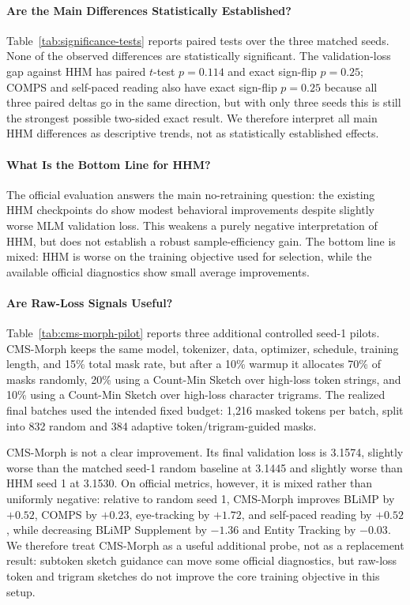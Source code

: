 \paragraph{Are the Main Differences Statistically Established?}
Table~\ref{tab:significance-tests} reports paired tests over the three matched seeds. None of the observed differences are statistically significant. The validation-loss gap against HHM has paired $t$-test $p=0.114$ and exact sign-flip $p=0.25$; COMPS and self-paced reading also have exact sign-flip $p=0.25$ because all three paired deltas go in the same direction, but with only three seeds this is still the strongest possible two-sided exact result. We therefore interpret all main HHM differences as descriptive trends, not as statistically established effects.

\paragraph{What Is the Bottom Line for HHM?}
The official evaluation answers the main no-retraining question: the existing HHM checkpoints do show modest behavioral improvements despite slightly worse MLM validation loss. This weakens a purely negative interpretation of HHM, but does not establish a robust sample-efficiency gain. The bottom line is mixed: HHM is worse on the training objective used for selection, while the available official diagnostics show small average improvements.

\paragraph{Are Raw-Loss Signals Useful?}
Table~\ref{tab:cms-morph-pilot} reports three additional controlled seed-1 pilots. CMS-Morph keeps the same model, tokenizer, data, optimizer, schedule, training length, and 15\% total mask rate, but after a 10\% warmup it allocates 70\% of masks randomly, 20\% using a Count-Min Sketch over high-loss token strings, and 10\% using a Count-Min Sketch over high-loss character trigrams. The realized final batches used the intended fixed budget: 1{,}216 masked tokens per batch, split into 832 random and 384 adaptive token/trigram-guided masks.

CMS-Morph is not a clear improvement. Its final validation loss is 3.1574, slightly worse than the matched seed-1 random baseline at 3.1445 and slightly worse than HHM seed 1 at 3.1530. On official metrics, however, it is mixed rather than uniformly negative: relative to random seed 1, CMS-Morph improves BLiMP by $+0.52$, COMPS by $+0.23$, eye-tracking by $+1.72$, and self-paced reading by $+0.52$, while decreasing BLiMP Supplement by $-1.36$ and Entity Tracking by $-0.03$. We therefore treat CMS-Morph as a useful additional probe, not as a replacement result: subtoken sketch guidance can move some official diagnostics, but raw-loss token and trigram sketches do not improve the core training objective in this setup.

